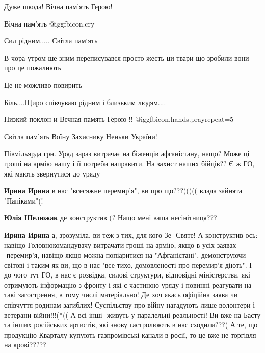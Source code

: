 \begin{itemize}
Дуже шкода! Вічна пам'ять Герою!

Вічна пам'ять  @igg{fbicon.cry} 

Сил рідним.....
Світла пам‘ять

В чора утром ше зним переписувався просто жесть ци твари що зробили вони про це пожалиють

Це не можливо повирить

Біль....Щиро співчуваю рідним і близьким людям....

Низкий поклон и Вечная память Герою !! @igg{fbicon.hands.pray}{repeat=5} 

Світла пам'ять Воїну Захиснику Неньки України!


Півмільярда грн. Уряд зараз витрачає на біженців афганістану, нащо? Може ці
гроші на армію нашу і її потреби направити. На захист наших бійців?? Є ж ГО,
які мають звернутися до уряду

\begin{itemize} %


\textbf{Ирина Ирина} в нас "всесяжне перемир'я", ви про що???((((( влада зайнята "Папіками"(!

\textbf{Юлія Шелюжак} де конструктив (? Нащо мені ваша несінітниця???

\textbf{Ирина Ирина} а, зрозуміла, ви теж з тих, для кого Зе- Святе!
А конструктив ось: навіщо Головнокомандувачу витрачати гроші на армію, якщо в усіх заявах -перемир'я, навіщо якщо можна попіаритися на "Афганістані", демонструючи світові і таким як ви, що в нас "все тихо, домовленості про перемир'я діють". І до чого тут ГО, в нас є розвідка, силові структури, відповідні міністерства, які отримують інформацію з фронту і які є частиною уряду і повинні реагувати на такі загострення, в тому числі матеріально! Де хоч якась офіційна заява чи співчуття родинам загиблих! Суспільству про війну нагадують лише волонтери і ветерани війни!!!(*((
А всі інші -живуть у паралельні реальності!
Ви вже на Басту та інших російських артистів, які знову гастролюють в нас сходили???( А те, що продукцію Кварталу купують газпромівські канали в росії, то це вже не торгівля на крові?????


\end{itemize}
\end{itemize}
